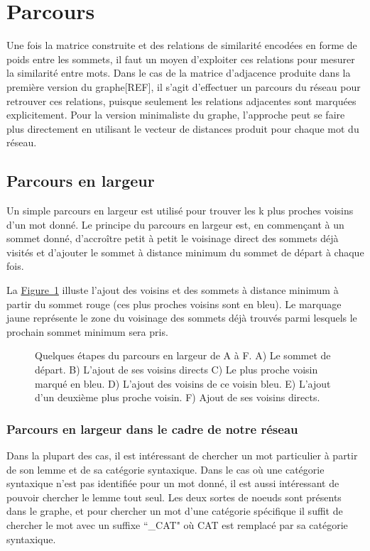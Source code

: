 \section{Parcours}

Une fois la matrice construite et des relations de similarité encodées en forme de poids entre les sommets, il faut un moyen d'exploiter ces relations pour mesurer la similarité entre mots. Dans le cas de la matrice d'adjacence produite dans la première version du graphe[REF], il s'agit d'effectuer un parcours du réseau pour retrouver ces relations, puisque seulement les relations adjacentes sont marquées explicitement. Pour la version minimaliste du graphe, l'approche peut se faire plus directement en utilisant le vecteur de distances produit pour chaque mot du réseau.

\subsection{Parcours en largeur}

Un simple parcours en largeur est utilisé pour trouver les k plus proches voisins d'un mot donné. Le principe du parcours en largeur est, en commençant à un sommet donné, d'accroître petit à petit le voisinage direct des sommets déjà visités et d'ajouter le sommet à distance minimum du sommet de départ à chaque fois.

La \hyperref[fig:bfs]{Figure~\ref*{fig:bfs}} illuste l'ajout des voisins et des sommets à distance minimum à partir du sommet rouge (ces plus proches voisins sont en bleu). Le marquage jaune représente le zone du voisinage des sommets déjà trouvés parmi lesquels le prochain sommet minimum sera pris.

\begin{figure}[!ht]
\centering
\def\svgwidth{\columnwidth}

\caption{Quelques étapes du parcours en largeur de A à F. A) Le sommet de départ. B) L'ajout de ses voisins directs
C) Le plus proche voisin marqué en bleu. D) L'ajout des voisins de ce voisin bleu. E) L'ajout d'un deuxième plus proche voisin. F) Ajout de ses voisins directs.}
\label{fig:bfs}
\end{figure}

\subsubsection{Parcours en largeur dans le cadre de notre réseau}

Dans la plupart des cas, il est intéressant de chercher un mot particulier à partir de son lemme et de sa catégorie syntaxique. Dans le cas où une catégorie syntaxique n'est pas identifiée pour un mot donné, il est aussi intéressant de pouvoir chercher le lemme tout seul. Les deux sortes de noeuds sont présents dans le graphe, et pour chercher un mot d'une catégorie spécifique il suffit de chercher le mot avec un suffixe ``\_CAT" où CAT est remplacé par sa catégorie syntaxique.

